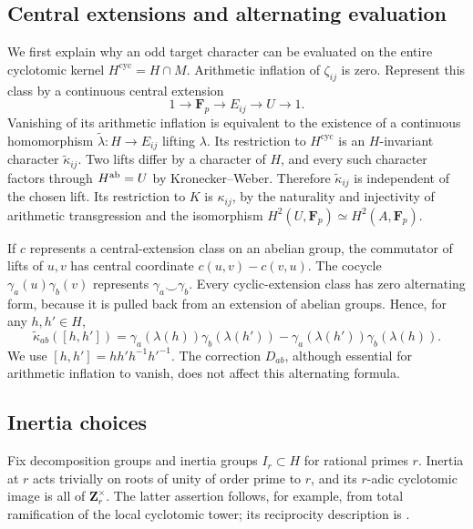 \subsection{Central extensions and alternating evaluation}

We first explain why an odd target character can be evaluated on
the entire cyclotomic kernel \(H^{\mathrm{cyc}}=H\cap M\).
Arithmetic inflation of \(\zeta_{ij}\) is zero.  Represent this
class by a continuous central extension
\[
             1\longrightarrow\mathbf F_p\longrightarrow E_{ij}
                         \longrightarrow U\longrightarrow1.
\]
Vanishing of its arithmetic inflation is equivalent to the
existence of a continuous homomorphism
\(\widetilde\lambda:H\to E_{ij}\) lifting \(\lambda\).
Its restriction to \(H^{\mathrm{cyc}}\) is an \(H\)-invariant
character \(\widetilde\kappa_{ij}\).
Two lifts differ by a character of \(H\), and every such
character factors through \(H^{\rm ab}=U\) by
Kronecker--Weber.  Therefore \(\widetilde\kappa_{ij}\) is
independent of the chosen lift.  Its restriction to \(K\) is
\(\kappa_{ij}\), by the naturality and injectivity of arithmetic
transgression and the isomorphism
\(H^2(U,\mathbf F_p)\simeq H^2(A,\mathbf F_p)\).

If \(c\) represents a central-extension class on an abelian
group, the commutator of lifts of \(u,v\) has central coordinate
\(c(u,v)-c(v,u)\).  The cocycle
\(\gamma_a(u)\gamma_b(v)\) represents
\(\gamma_a\smile\gamma_b\).  Every cyclic-extension class
has zero alternating form, because it is pulled back from an
extension of abelian groups.  Hence, for any \(h,h'\in H\),
\begin{equation}\label{eq:odd-mixed-alternation}
 \widetilde\kappa_{ab}([h,h'])
   =\gamma_a(\lambda(h))\gamma_b(\lambda(h'))
      -\gamma_a(\lambda(h'))\gamma_b(\lambda(h)).
\end{equation}
We use \([h,h']=hh'h^{-1}h'^{-1}\).  The correction
\(D_{ab}\), although essential for arithmetic inflation to
vanish, does not affect this alternating formula.

\subsection{Inertia choices}

Fix decomposition groups and inertia groups \(I_r\subset H\)
for rational primes \(r\).  Inertia at \(r\) acts trivially on
roots of unity of order prime to \(r\), and its \(r\)-adic
cyclotomic image is all of \(\mathbf Z_r^\times\).
The latter assertion follows, for example, from total
ramification of the local cyclotomic tower; its reciprocity
description is \cite[I, Theorem~1.1, p.~20]{MilneCFT}.

